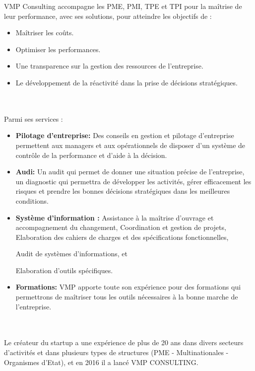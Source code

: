 \documentclass[12pt]{article}
\begin{document}
VMP Consulting accompagne les PME, PMI, TPE et TPI pour la maîtrise de leur performance, avec ses solutions, pour atteindre les objectifs de :
\begin{itemize}

\item Maîtriser les coûts.

\item Optimiser les performances.

\item Une transparence sur la gestion des ressources de  l'entreprise.

\item Le développement de la réactivité dans la prise de décisions stratégiques.
\end{itemize}
\\ \\ 


Parmi ses services :
\begin{itemize}

\item \textbf{Pilotage d'entreprise: } Des conseils en gestion et pilotage d'entreprise permettent aux managers et aux opérationnels de disposer d’un système de contrôle de la performance et d’aide à la décision.


\item \textbf{Audi: } Un audit qui permet de donner une situation précise de l'entreprise, un
diagnostic qui  permettra de développer les activités, gérer efficacement les risques et prendre les bonnes décisions stratégiques dans les meilleures conditions.


\item \textbf{Système d'information : }  Assistance à la maîtrise d’ouvrage et accompagnement du changement,
 Coordination et gestion de projets, 
 Elaboration des cahiers de charges et des spécifications fonctionnelles, 

 Audit de systèmes d’informations, et

Elaboration d’outils spécifiques.


\item \textbf{Formations: } VMP apporte toute son expérience pour des formations qui permettrons de maîtriser tous les outils nécessaires à la bonne marche de l'entreprise.
\end{itemize}
\\ \\ 



Le créateur du startup a une expérience de plus de 20 ans dans divers secteurs d'activités et dans plusieurs types de structures (PME - Multinationales - Organismes d'Etat), et en 2016 il a lancé VMP CONSULTING.
\end{document}
